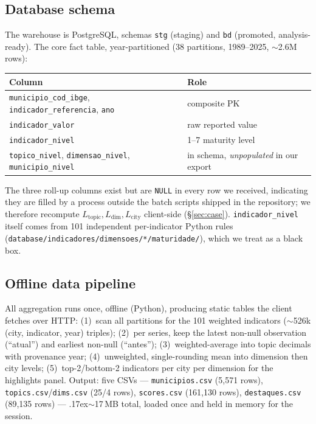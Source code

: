 \documentclass[10pt,twocolumn]{article}
\begin{document}
\subsection{Database schema}
\label{sec:schema}
The warehouse is PostgreSQL, schemas \texttt{stg} (staging) and \texttt{bd} (promoted, analysis-ready). The core fact table, year-partitioned (38 partitions, 1989--2025, $\sim$2.6M rows):
\begin{center}\small\begin{tabular}{@{}ll@{}}
\toprule \textbf{Column} & \textbf{Role} \\ \midrule
\texttt{municipio\_cod\_ibge}, \texttt{indicador\_referencia}, \texttt{ano} & composite PK \\
\texttt{indicador\_valor} & raw reported value \\
\texttt{indicador\_nivel} & 1--7 maturity level \\
\texttt{topico\_nivel}, \texttt{dimensao\_nivel}, \texttt{municipio\_nivel} & in schema, \emph{unpopulated} in our export \\
\bottomrule\end{tabular}\end{center}
The three roll-up columns exist but are \texttt{NULL} in every row we received, indicating they are filled by a process outside the batch scripts shipped in the repository; we therefore recompute $L_{\text{topic}}, L_{\text{dim}}, L_{\text{city}}$ client-side (\S\ref{sec:case}). \texttt{indicador\_nivel} itself comes from 101 independent per-indicator Python rules (\texttt{database/indicadores/dimensoes/*/maturidade/}), which we treat as a black box.

\subsection{Offline data pipeline}
All aggregation runs once, offline (Python), producing static tables the client fetches over HTTP: (1)~scan all partitions for the 101 weighted indicators ($\sim$526k (city, indicator, year) triples); (2)~per series, keep the latest non-null observation (``atual'') and earliest non-null (``antes''); (3)~weighted-average into topic decimals with provenance year; (4)~unweighted, single-rounding mean into dimension then city levels; (5)~top-2/bottom-2 indicators per city per dimension for the highlights panel. Output: five CSVs — \texttt{municipios.csv} (5{,}571 rows), \texttt{topics.csv}/\texttt{dims.csv} (25/4 rows), \texttt{scores.csv} (161{,}130 rows), \texttt{destaques.csv} (89{,}135 rows) — \raise.17ex\hbox{$\scriptstyle\sim$}17\,MB total, loaded once and held in memory for the session.
\end{document}
